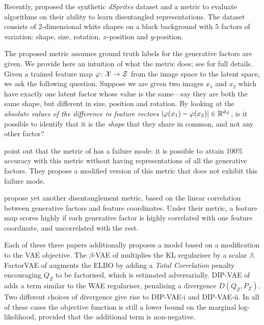Recently, \citet{HM+17} proposed the synthetic \emph{dSprites} dataset and a metric to evaluate algorithms on their ability to learn disentangled representations. The dataset consists of $2$-dimensional white shapes on a black background with $5$ factors of variation: shape, size, rotation, $x$-position and $y$-position. 

The proposed metric assumes ground truth labels for the generative factors are given. We provide here an intuition of what the metric does; see \citet{HM+17} for full details. Given a trained feature map $\varphi\colon \mathcal{X}\to\mathcal{Z}$ from the image space to the latent space, we ask the following question. Suppose we are given two images $x_1$ and $x_2$ which have exactly one latent factor whose value is the same---say they are both the same shape, but different in size, position and rotation. 
By looking at the \emph{absolute values of the difference in feature vectors} ${|\varphi(x_1) - \varphi(x_2)|}\in\mathbb{R}^{d_{\mathcal{Z}}}$, is it possible to identify that it is the \emph{shape} that they share in common, and not any other factor? 

\cite{kim2018disentangling} point out that the metric of \cite{HM+17} has a failure mode: it is possible to attain 100\% accuracy with this metric without having representations of all the generative factors. They propose a modified version of this metric that does not exhibit this failure mode. 

\cite{kumar2017variational} propose yet another disentanglement metric, based on the linear correlation between generative factors and feature coordinates. Under their metric, a feature map scores highly if each generative factor is highly correlated with one feature coordinate, and uncorrelated with the rest.

Each of these three papers additionally proposes a model based on a modification to the VAE objective. The $\beta$-VAE of \cite{HM+17} multiplies the KL regulariser by a scalar $\beta$. 
FactorVAE of \cite{kim2018disentangling} augments the ELBO by adding a \emph{Total Correlation} penalty encouraging $Q_Z$ to be factorised, which is estimated adversarially. 
DIP-VAE of \cite{kumar2017variational} adds a term similar to the WAE regulariser, penalising a divergence $D(Q_Z, P_Z)$. 
Two different choices of divergence give rise to DIP-VAE-i and DIP-VAE-ii.
In all of these cases the objective function is still a lower bound on the marginal log-likelihood, provided that the additional term is non-negative.

